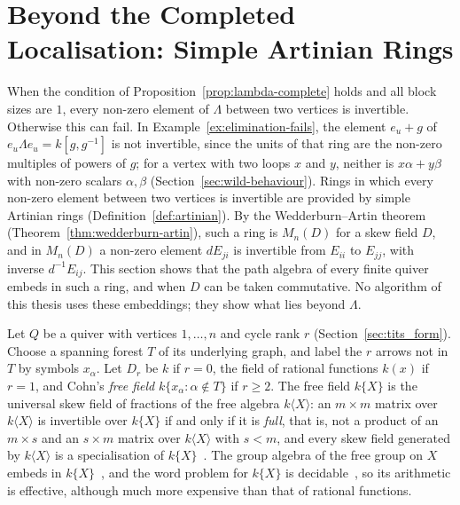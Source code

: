 \documentclass[12pt, a4paper]{report}
\theoremstyle{plain}
\theoremstyle{definition}
\theoremstyle{remark}
\theoremstyle{plain}
\begin{document}
\section{Beyond the Completed Localisation: Simple Artinian Rings}
\label{sec:embedding}
When the condition of Proposition~\ref{prop:lambda-complete} holds and all block sizes are $1$, every non-zero element of $\Lambda$ between two vertices is invertible. Otherwise this can fail. In Example~\ref{ex:elimination-fails}, the element $e_u+g$ of $e_u\Lambda e_u=k[g,g^{-1}]$ is not invertible, since the units of that ring are the non-zero multiples of powers of $g$; for a vertex with two loops $x$ and $y$, neither is $x\alpha+y\beta$ with non-zero scalars $\alpha,\beta$ (Section~\ref{sec:wild-behaviour}). Rings in which every non-zero element between two vertices is invertible are provided by simple Artinian rings (Definition~\ref{def:artinian}). By the Wedderburn--Artin theorem (Theorem~\ref{thm:wedderburn-artin}), such a ring is $M_n(D)$ for a skew field $D$, and in $M_n(D)$ a non-zero element $dE_{ji}$ is invertible from $E_{ii}$ to $E_{jj}$, with inverse $d^{-1}E_{ij}$. This section shows that the path algebra of every finite quiver embeds in such a ring, and when $D$ can be taken commutative. No algorithm of this thesis uses these embeddings; they show what lies beyond $\Lambda$.

Let $Q$ be a quiver with vertices $1,\dots,n$ and cycle rank $r$ (Section~\ref{sec:tits_form}). Choose a spanning forest $T$ of its underlying graph, and label the $r$ arrows not in $T$ by symbols $x_\alpha$. Let $D_r$ be $k$ if $r=0$, the field of rational functions $k(x)$ if $r=1$, and Cohn's \emph{free field} $k\{x_\alpha:\alpha\notin T\}$ if $r\geq2$. The free field $k\{X\}$ is the universal skew field of fractions of the free algebra $k\langle X\rangle$: an $m\times m$ matrix over $k\langle X\rangle$ is invertible over $k\{X\}$ if and only if it is \emph{full}, that is, not a product of an $m\times s$ and an $s\times m$ matrix over $k\langle X\rangle$ with $s<m$, and every skew field generated by $k\langle X\rangle$ is a specialisation of $k\{X\}$~\cite[Chapter~7]{Cohn2006}. The group algebra of the free group on $X$ embeds in $k\{X\}$~\cite{Lewin1974}, and the word problem for $k\{X\}$ is decidable~\cite{CohnReutenauer1999}, so its arithmetic is effective, although much more expensive than that of rational functions.
\end{document}
